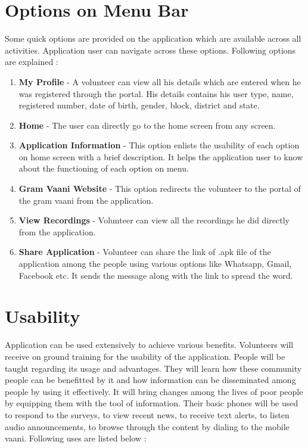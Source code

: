 \begin{itemize}
\section {Options on Menu Bar}

Some quick options are provided on the application which are available across all activities. Application  user can navigate across these options. Following options are explained :
\begin{enumerate}
\item \textbf {My Profile} - A volunteer can view all his details which are entered when he was registered through the portal. His details contains his user type, name, registered number, date of birth, gender, block, district and state.
\item \textbf{Home} - The user can directly go to the home screen from any screen.
\item \textbf{Application Information} - This option enlists the usability of each option on home screen with a brief description. It helps the application user to know about the functioning of each option on menu.
\item \textbf{Gram Vaani Website} - This option redirects the volunteer to the portal of the gram vaani from the application.
\item \textbf{View Recordings} - Volunteer can view all the recordings he did directly from the application.
\item \textbf{Share Application} - Volunteer can share the link of .apk file of the application among the people using various options like Whatsapp, Gmail, Facebook etc. It sends the message along with the link to spread the word.
\end{enumerate}


\section {Usability}

Application can be used extensively to achieve various benefits. Volunteers will receive on ground training for the usability of the application. People will be taught regarding its usage and advantages. They will learn how these community people can be benefitted by it and how information can be disseminated among people by using it effectively. It will bring changes among the lives of poor people by equipping them with the tool of information. Their basic phones will be used to respond to the surveys, to view recent news, to receive text alerts, to listen audio announcements, to browse through the content by dialing to the mobile vaani. Following uses are listed below :


\end{itemize}
